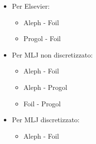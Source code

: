 \begin{itemize}
	\item Per Elsevier:
		\begin{itemize}
			\item Aleph - Foil
			\item Progol - Foil
		\end{itemize}
	\item Per MLJ non discretizzato:
		\begin{itemize}
			\item Aleph - Foil
			\item Aleph - Progol
			\item Foil - Progol
		\end{itemize}
	\item Per MLJ discretizzato:
		\begin{itemize}
			\item Aleph - Foil
		\end{itemize}
\end{itemize}

